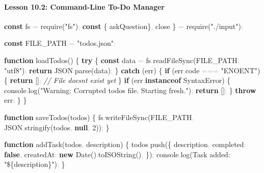 \documentclass[
  justified,
  openright,
]{tufte-book}
\let\subsection\paragraph
\let\paragraph\paragraph
\newcommand{\KeywordTok}[1]{\textcolor{CodeKeyword}{\textbf{#1}}}  %
\newcommand{\StringTok}[1]{\textcolor{CodeString}{#1}}              %
\newcommand{\CommentTok}[1]{\textcolor{CodeComment}{\textit{#1}}}  %
\newcommand{\CodeNumTok}[1]{\textcolor{CodeNumber}{#1}}             %
\newcommand{\CodeFuncTok}[1]{\textcolor{CodeKeyword}{#1}}           %
\newcommand{\CodeTypeTok}[1]{\textcolor{CodeType}{#1}}              %
\newcommand{\CodeAccentTok}[1]{\textcolor{CodeAccent}{#1}}          %
\newcommand{\OperatorTok}[1]{\textcolor{DarkGray}{#1}}              %
\newenvironment{Shaded}{%
  \begin{mdframed}[style=TufteCode]%
}{%
  \end{mdframed}%
}
\let\subsection\paragraph
\let\paragraph\paragraph
\begin{document}
\subsection{Lesson 10.2: Command-Line To-Do
Manager}\label{lesson-10.2-command-line-to-do-manager}

\begin{Shaded}
\begin{Highlighting}[]
\KeywordTok{const} fs \OperatorTok{=} \CodeAccentTok{require}(\StringTok{"fs"})\OperatorTok{;}
\KeywordTok{const} \{ askQuestion\}\OperatorTok{,} close \} \OperatorTok{=} \CodeAccentTok{require}(\StringTok{"./input"})\OperatorTok{;}
 
\KeywordTok{const} FILE\_PATH \OperatorTok{=} \StringTok{"todos.json"}\OperatorTok{;}
 
\KeywordTok{function} \CodeFuncTok{loadTodos}() \{
  \KeywordTok{try} \{
    \KeywordTok{const} data \OperatorTok{=} fs\OperatorTok{.}\CodeFuncTok{readFileSync}(FILE\_PATH\OperatorTok{,} \StringTok{"utf8"})\OperatorTok{;}
    \KeywordTok{return} JSON\OperatorTok{.}\CodeFuncTok{parse}(data)\OperatorTok{;}
  \} \KeywordTok{catch} (err) \{
    \KeywordTok{if} (err\OperatorTok{.}\CodeTypeTok{code} \OperatorTok{===} \StringTok{"ENOENT"}) \{
      \KeywordTok{return} []\OperatorTok{;} \CommentTok{// File doesn\textquotesingle{}t exist yet}
    \}
    \KeywordTok{if} (err \KeywordTok{instanceof} SyntaxError) \{
      console\OperatorTok{.}\CodeFuncTok{log}(\StringTok{"Warning: Corrupted todos file. Starting fresh."})\OperatorTok{;}
      \KeywordTok{return} []\OperatorTok{;}
    \}
    \KeywordTok{throw} err\OperatorTok{;}
  \}
\}
 
\KeywordTok{function} \CodeFuncTok{saveTodos}(todos) \{
  fs\OperatorTok{.}\CodeFuncTok{writeFileSync}(FILE\_PATH\OperatorTok{,} JSON\OperatorTok{.}\CodeFuncTok{stringify}(todos\OperatorTok{,} \KeywordTok{null}\OperatorTok{,} \CodeNumTok{2}))\OperatorTok{;}
\}
 
\KeywordTok{function} \CodeFuncTok{addTask}(todos\OperatorTok{,} description) \{
  todos\OperatorTok{.}\CodeFuncTok{push}(\{
    description\OperatorTok{,}
    \CodeTypeTok{completed}\OperatorTok{:} \KeywordTok{false}\OperatorTok{,}
    \CodeTypeTok{createdAt}\OperatorTok{:} \KeywordTok{new} Date()\OperatorTok{.}\CodeFuncTok{toISOString}()\OperatorTok{,}
  \})\OperatorTok{;}
  console\OperatorTok{.}\CodeFuncTok{log}(\StringTok{\textasciigrave{}Task added: "}\StringTok{\$\{}description\StringTok{\}}\StringTok{"\textasciigrave{}})\OperatorTok{;}
\}
 

\end{Highlighting}
\end{Shaded}
\end{document}
